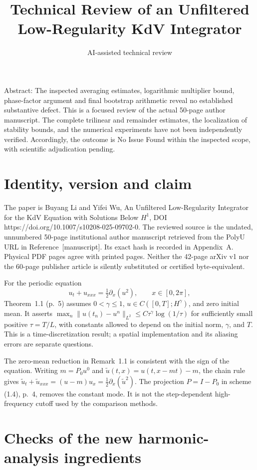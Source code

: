 \documentclass[10pt]{article}
\title{Technical Review of an Unfiltered
Low-Regularity KdV Integrator}
\author{AI-assisted technical review}
\date{}
\begin{document}
\maketitle
Abstract: The inspected averaging estimates, logarithmic multiplier bound, phase-factor argument and final bootstrap arithmetic reveal no established substantive defect. This is a focused review of the actual 50-page author manuscript. The complete trilinear and remainder estimates, the localization of stability bounds, and the numerical experiments have not been independently verified. Accordingly, the outcome is No Issue Found within the inspected scope, with scientific adjudication pending.\par
\section*{Identity, version and claim}
The paper is Buyang Li and Yifei Wu, An Unfiltered Low-Regularity Integrator for the KdV Equation with Solutions Below \(H^1\), DOI https://doi.org/10.1007/s10208-025-09702-0. The reviewed source is the undated, unnumbered 50-page institutional author manuscript retrieved from the PolyU URL in Reference [manuscript]. Its exact hash is recorded in Appendix A. Physical PDF pages agree with printed pages. Neither the 42-page arXiv v1 nor the 60-page publisher article is silently substituted or certified byte-equivalent.\par
For the periodic equation \[u_t+u_{xxx}=\tfrac12\partial_x(u^2),\qquad x\in[0,2\pi],\] Theorem 1.1 (p. 5) assumes \(0<\gamma\le1\), \(u\in C([0,T];H^\gamma)\), and zero initial mean. It asserts \(\max_n\|u(t_n)-u^n\|_{L^2}\le C\tau^\gamma\log(1/\tau)\) for sufficiently small positive \(\tau=T/L\), with constants allowed to depend on the initial norm, \(\gamma\), and \(T\). This is a time-discretization result; a spatial implementation and its aliasing errors are separate questions.\par
The zero-mean reduction in Remark 1.1 is consistent with the sign of the equation. Writing \(m=P_0u^0\) and \(\widetilde u(t,x)=u(t,x-mt)-m\), the chain rule gives \(\widetilde u_t+\widetilde u_{xxx}=(u-m)u_x
=\frac12\partial_x(\widetilde u^2)\). The projection \(P=I-P_0\) in scheme (1.4), p. 4, removes the constant mode. It is not the step-dependent high-frequency cutoff used by the comparison methods.\par
\section*{Checks of the new harmonic-analysis ingredients}
\end{document}
